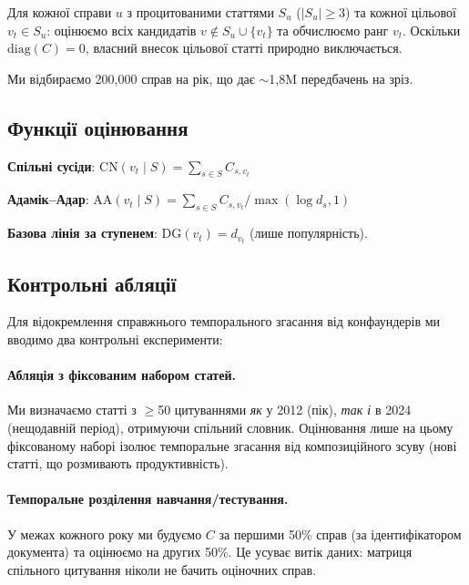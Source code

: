 Для кожної справи $u$ з процитованими статтями $S_u$ ($|S_u| \geq 3$) та кожної цільової $v_t \in S_u$:
оцінюємо всіх кандидатів $v \notin S_u \cup \{v_t\}$ та обчислюємо ранг $v_t$.
Оскільки $\text{diag}(C) = 0$, власний внесок цільової статті природно виключається.

Ми відбираємо 200{,}000 справ на рік, що дає $\sim$1,8M передбачень на зріз.

\subsection{Функції оцінювання}

\textbf{Спільні сусіди}: $\text{CN}(v_t \mid S) = \sum_{s \in S} C_{s, v_t}$

\textbf{Адамік–Адар}: $\text{AA}(v_t \mid S) = \sum_{s \in S} C_{s, v_t} / \max(\log d_s, 1)$

\textbf{Базова лінія за ступенем}: $\text{DG}(v_t) = d_{v_t}$ (лише популярність).

\subsection{Контрольні абляції}

Для відокремлення справжнього темпорального згасання від конфаундерів ми вводимо два контрольні експерименти:

\paragraph{Абляція з фіксованим набором статей.}
Ми визначаємо статті з $\geq$50 цитуваннями \emph{як} у 2012 (пік), \emph{так і} в 2024 (нещодавній період), отримуючи спільний словник.
Оцінювання лише на цьому фіксованому наборі ізолює темпоральне згасання від композиційного зсуву (нові статті, що розмивають продуктивність).

\paragraph{Темпоральне розділення навчання/тестування.}
У межах кожного року ми будуємо $C$ за першими 50\% справ (за ідентифікатором документа) та оцінюємо на других 50\%.
Це усуває витік даних: матриця спільного цитування ніколи не бачить оціночних справ.
